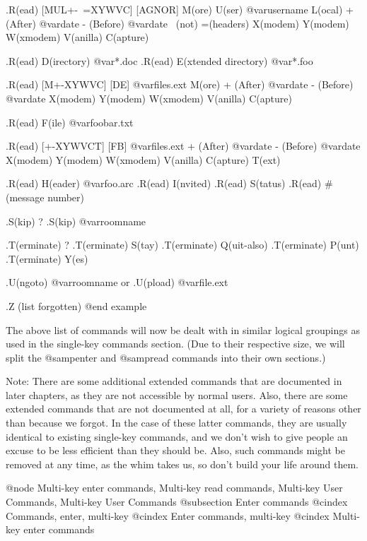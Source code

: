 .R(ead) [MUL+-~=XYWVC] [AGNOR]
        M(ore)
        U(ser) @var{username}
        L(ocal)
        + (After) @var{date}
        - (Before) @var{date}
        ~(not)
        =(headers)
        X(modem)
        Y(modem)
        W(xmodem)
        V(anilla)
        C(apture)

.R(ead) D(irectory) @var{*.doc}
.R(ead) E(xtended directory) @var{*.foo}

.R(ead) [M+-XYWVC] [DE] @var{files.ext}
        M(ore)
        + (After) @var{date}
        - (Before) @var{date}
        X(modem)
        Y(modem)
        W(xmodem)
        V(anilla)
        C(apture)

.R(ead) F(ile) @var{foobar.txt}

.R(ead) [+-XYWVCT] [FB] @var{files.ext}
        + (After) @var{date}
        - (Before) @var{date}
        X(modem)
        Y(modem)
        W(xmodem)
        V(anilla)
        C(apture)
        T(ext)

.R(ead) H(eader) @var{foo.arc}
.R(ead) I(nvited)
.R(ead) S(tatus)
.R(ead) # (message number)

.S(kip) ?
.S(kip) @var{roomname}

.T(erminate) ?
.T(erminate) S(tay)
.T(erminate) Q(uit-also)
.T(erminate) P(unt)
.T(erminate) Y(es)

.U(ngoto) @var{roomname}
or
.U(pload) @var{file.ext}

.Z (list forgotten)
@end example

The above list of commands will now be dealt with in similar logical groupings as
used in the single-key commands section.  (Due to their respective size, we will
split the @samp{enter} and @samp{read} commands into their own sections.)

Note:  There are some additional extended commands that are documented in
later chapters, as they are not accessible by normal users.  Also, there are
some extended commands that are not documented at all, for a variety of
reasons other than because we forgot.  In the case of these latter commands, they are
usually identical to existing single-key commands, and we don't wish to give
people an excuse to be less efficient than they should be.  Also, such commands might
be removed at any time, as the whim takes us, so don't build your life around
them.

@node Multi-key enter commands, Multi-key read commands, Multi-key User Commands, Multi-key User Commands
@subsection Enter commands
@cindex Commands, enter, multi-key
@cindex Enter commands, multi-key
@cindex Multi-key enter commands

